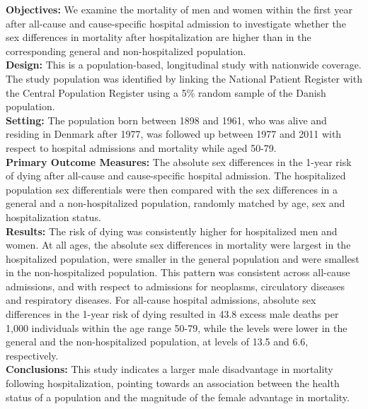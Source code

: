 \textbf{Objectives:} We examine the mortality of men and women within the first 
year after all-cause and cause-specific hospital admission 
to investigate whether the sex differences in mortality 
after hospitalization are higher than in the corresponding 
general and non-hospitalized population.\\
\textbf{Design:} This is a population-based, longitudinal study with 
nationwide coverage. The study population was identified 
by linking the National Patient Register with the Central 
Population Register using a 5\% random sample of the Danish 
population.\\
\textbf{Setting:} The population born between 1898 and 1961, who was alive 
and residing in Denmark after 1977, was followed up between 
1977 and 2011 with respect to hospital admissions and mortality 
while aged 50-79.\\
\textbf{Primary Outcome Measures:} The absolute sex 
differences in the 1-year risk of dying after all-cause 
and cause-specific hospital admission. The hospitalized 
population sex differentials were then compared with 
the sex differences in a general and a non-hospitalized 
population, randomly matched by age, sex and hospitalization 
status.\\
\textbf{Results:} The risk of dying was consistently higher 
for hospitalized men and women. At all ages, the absolute 
sex differences in mortality were largest in the hospitalized 
population, were smaller in the general population and were 
smallest in the non-hospitalized population. This pattern 
was consistent across all-cause admissions, and with respect 
to admissions for neoplasms, circulatory diseases and 
respiratory diseases. For all-cause hospital admissions, 
absolute sex differences in the 1-year risk of dying resulted 
in 43.8 excess male deaths per 1,000 individuals within 
the age range 50-79, while the levels were lower in the 
general and the non-hospitalized population, at levels 
of 13.5 and 6.6, respectively.\\
\textbf{Conclusions:} This study indicates a larger male 
disadvantage in mortality following hospitalization, pointing 
towards an association between the health status of a population 
and the magnitude of the female advantage in mortality.




